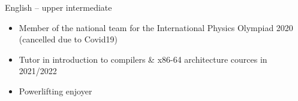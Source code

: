     English -- upper intermediate
    \smallskip

    \begin{itemize}
        \item Member of the national team for the International Physics Olympiad 2020 (cancelled due to Covid19)
        \item Tutor in introduction to compilers \& x86-64 architecture cources in 2021/2022
        \item Powerlifting enjoyer
    \end{itemize}


